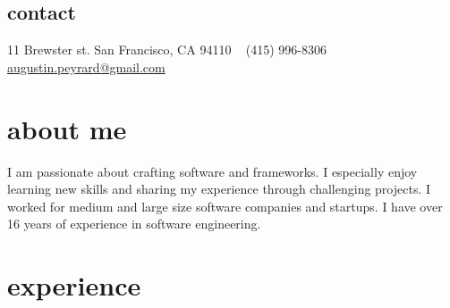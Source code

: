 \documentclass[]{k-cv} %
\begin{document}


\begin{aside} %
\section{contact}
11 Brewster st.
San Francisco, CA 94110
~
(415) 996-8306
~
\href{mailto:augustin.peyrard@gmail.com}{augustin.peyrard@gmail.com}
\end{aside}


\section{about me}
\begin{freetext}
{I am passionate about crafting software and frameworks.
I especially enjoy learning new skills and sharing my experience through challenging projects.
I worked for medium and large size software companies and startups.
I have over 16 years of experience in software engineering.}
\end{freetext}

\section{experience}
\end{document}
